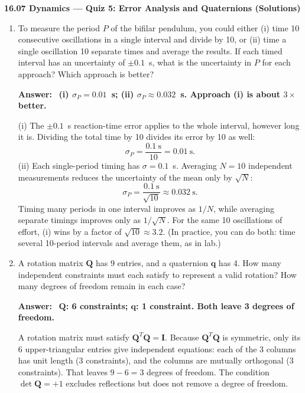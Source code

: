 \documentclass[11pt,letterpaper]{article}
\newenvironment{answer}{\par\vspace{4pt}\color{blue!60!black}\textbf{Answer:}\ }{\par\vspace{4pt}}
\begin{document}
\begin{center}
    {\Large \textbf{16.07 Dynamics --- Quiz 5: Error Analysis and Quaternions (Solutions)}}\\[4pt]
\end{center}

\vspace{10pt}
\begin{enumerate}[label=\textbf{\arabic*.}, leftmargin=*, itemsep=4pt]

\item To measure the period $P$ of the bifilar pendulum, you could either (i) time 10 consecutive oscillations in a single interval and divide by 10, or (ii) time a single oscillation 10 separate times and average the results. If each timed interval has an uncertainty of $\pm 0.1$~s, what is the uncertainty in $P$ for each approach? Which approach is better?

\begin{answer}
\textbf{(i) $\sigma_P = 0.01$~s; (ii) $\sigma_P \approx 0.032$~s. Approach (i) is about $3\times$ better.}

(i) The $\pm0.1$~s reaction-time error applies to the whole interval, however long it is. Dividing the total time by 10 divides its error by 10 as well:
\[
\sigma_P = \frac{0.1~\text{s}}{10} = 0.01~\text{s}.
\]
(ii) Each single-period timing has $\sigma = 0.1$~s. Averaging $N = 10$ independent measurements reduces the uncertainty of the mean only by $\sqrt{N}$:
\[
\sigma_P = \frac{0.1~\text{s}}{\sqrt{10}} \approx 0.032~\text{s}.
\]
Timing many periods in one interval improves as $1/N$, while averaging separate timings improves only as $1/\sqrt{N}$. For the same 10 oscillations of effort, (i) wins by a factor of $\sqrt{10} \approx 3.2$. (In practice, you can do both: time several 10-period intervals and average them, as in lab.)
\end{answer}

\item A rotation matrix $\mathbf{Q}$ has 9 entries, and a quaternion $\mathbf{q}$ has 4. How many independent constraints must each satisfy to represent a valid rotation? How many degrees of freedom remain in each case?

\begin{answer}
\textbf{$\mathbf{Q}$: 6 constraints; $\mathbf{q}$: 1 constraint. Both leave 3 degrees of freedom.}

A rotation matrix must satisfy $\mathbf{Q}^{T}\mathbf{Q} = \mathbf{I}$. Because $\mathbf{Q}^{T}\mathbf{Q}$ is symmetric, only its 6 upper-triangular entries give independent equations: each of the 3 columns has unit length (3 constraints), and the columns are mutually orthogonal (3 constraints). That leaves $9 - 6 = 3$ degrees of freedom. The condition $\det\mathbf{Q} = +1$ excludes reflections but does not remove a degree of freedom.


\end{answer}
\end{enumerate}
\end{document}
